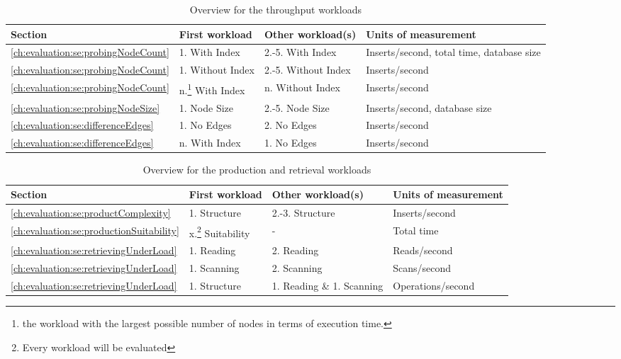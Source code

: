\begin{table}
  \begin{minipage}{\textwidth}
    \centering
    \begin{tabularx}{\textwidth}{ | l | l | l | X | }
      \hline
      Section & First workload & Other workload(s) & Units of measurement \\ \hline
      \ref{ch:evaluation:se:probingNodeCount} & 1. With Index & 2.-5. With Index & Inserts/second, total time, database size \\ \hline
      \ref{ch:evaluation:se:probingNodeCount} & 1. Without Index & 2.-5. Without Index & Inserts/second \\ \hline
      \ref{ch:evaluation:se:probingNodeCount} & n.\footnote{the workload with the largest possible number of nodes in terms of execution time.} With Index & n. Without Index & Inserts/second \\ \hline
      \ref{ch:evaluation:se:probingNodeSize} & 1. Node Size & 2.-5. Node Size & Inserts/second, database size \\ \hline
      \ref{ch:evaluation:se:differenceEdges} & 1. No Edges & 2. No Edges & Inserts/second \\ \hline
      \ref{ch:evaluation:se:differenceEdges} & n. With Index & 1. No Edges & Inserts/second \\ \hline
    \end{tabularx}
  \end{minipage}
  \caption{Overview for the throughput workloads }
  \label{tab:throughputOverview}
\end{table}
\begin{table}
  \begin{minipage}{\hsize}
    \centering
    \begin{tabular}{ | l | l | l | l | }
      \hline
      Section & First workload & Other workload(s) & Units of measurement \\ \hline
      \ref{ch:evaluation:se:productComplexity} & 1. Structure & 2.-3. Structure & Inserts/second \\ \hline
      \ref{ch:evaluation:se:productionSuitability} & x.\footnote{Every workload will be evaluated} Suitability & - & Total time \\ \hline
      \ref{ch:evaluation:se:retrievingUnderLoad} & 1. Reading & 2. Reading & Reads/second \\ \hline
      \ref{ch:evaluation:se:retrievingUnderLoad} & 1. Scanning & 2. Scanning & Scans/second \\ \hline
      \ref{ch:evaluation:se:retrievingUnderLoad} & 1. Structure & 1. Reading \& 1. Scanning & Operations/second \\ \hline
    \end{tabular}
  \end{minipage}
  \caption{Overview for the production and retrieval workloads}
  \label{tab:productionOverview}
\end{table}


